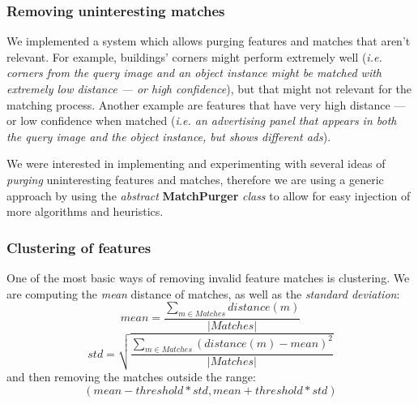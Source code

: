 \documentclass[a4paper,onecolumn,oneside,titlepage,11pt]{report}
\begin{document}
\subsubsection{Removing uninteresting matches}
We implemented a system which allows purging features and matches that aren't relevant. For example, buildings' corners might perform extremely well (\emph{i.e. corners from the query image and an object instance might be matched with extremely low distance --- or high confidence}), but that might not relevant for the matching process. Another example are features that have very high distance --- or low confidence when matched (\emph{i.e. an advertising panel that appears in both the query image and the object instance, but shows different ads}).

We were interested in implementing and experimenting with several ideas of \emph{purging} uninteresting features and matches, therefore we are using a generic approach by using the \emph{abstract} \textbf{MatchPurger} \emph{class} to allow for easy injection of more algorithms and heuristics.

\subsubsection{Clustering of features}
One of the most basic ways of removing invalid feature matches is clustering. We are computing the \emph{mean} distance of matches, as well as the \emph{standard deviation}:
$$
mean = \frac{\sum_{m \in Matches}distance(m)}{|Matches|}
$$
$$
std = \sqrt{\frac{\sum_{m \in Matches} (distance(m) - mean)^2}{|Matches|}}
$$
and then removing the matches outside the range:
$$
(mean - threshold * std, mean + threshold * std)
$$
\end{document}
